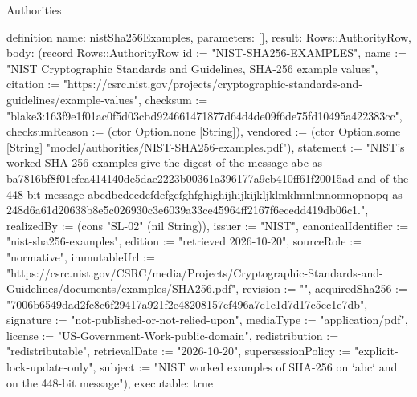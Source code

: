 \begin{lexlean}{Authorities}
\begin{semanticmodule}
definition{
  name: nistSha256Examples,
  parameters: [],
  result: Rows::AuthorityRow,
  body: (record Rows::AuthorityRow {id := "NIST-SHA256-EXAMPLES", name := "NIST Cryptographic Standards and Guidelines, SHA-256 example values", citation := "https://csrc.nist.gov/projects/cryptographic-standards-and-guidelines/example-values", checksum := "blake3:163f9e1f01ac0f5d03cbd924661471877d64d4de09f6de75fd10495a422383cc", checksumReason := (ctor Option.none [String]), vendored := (ctor Option.some [String] "model/authorities/NIST-SHA256-examples.pdf"), statement := "NIST's worked SHA-256 examples give the digest of the message abc as ba7816bf8f01cfea414140de5dae2223b00361a396177a9cb410ff61f20015ad and of the 448-bit message abcdbcdecdefdefgefghfghighijhijkijkljklmklmnlmnomnopnopq as 248d6a61d20638b8e5c026930c3e6039a33ce45964ff2167f6ecedd419db06c1.", realizedBy := (cons "SL-02" (nil String)), issuer := "NIST", canonicalIdentifier := "nist-sha256-examples", edition := "retrieved 2026-10-20", sourceRole := "normative", immutableUrl := "https://csrc.nist.gov/CSRC/media/Projects/Cryptographic-Standards-and-Guidelines/documents/examples/SHA256.pdf", revision := "", acquiredSha256 := "7006b6549dad2fc8c6f29417a921f2e48208157ef496a7e1e1d7d17c5cc1e7db", signature := "not-published-or-not-relied-upon", mediaType := "application/pdf", license := "US-Government-Work-public-domain", redistribution := "redistributable", retrievalDate := "2026-10-20", supersessionPolicy := "explicit-lock-update-only", subject := "NIST worked examples of SHA-256 on `abc` and on the 448-bit message"}),
  executable: true
}


\end{semanticmodule}
\end{lexlean}
